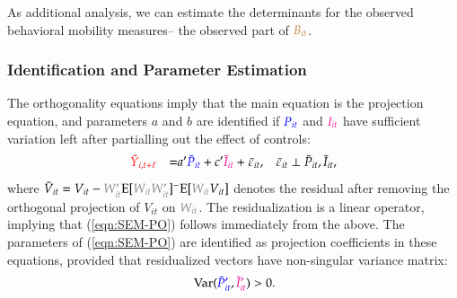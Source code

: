 \documentclass[9pt,twoside,lineno]{pnas-new}
\theoremstyle{definition}
\providecommand{\Var}{{\mathrm{Var}}}
\newcommand{\Ep}{{\mathrm{E}}}
\def\bcolor{\color{brown}}
\def\pcolor{\color{blue}}
\def\icolor{\color{magenta}}
\def\wcolor{\color{gray}}
\def\ycolor{\color{red}}
\begin{document}
As additional analysis, we can estimate the determinants for the observed behavioral mobility measures-- the observed part of  ${\bcolor B_{it}}$. 




\subsubsection*{Identification and Parameter Estimation}

The orthogonality equations imply that the main equation is the projection equation, and parameters $a$ and $b$ are identified if ${\pcolor P_{it}}$ and ${\icolor I_{it}}$ have sufficient variation left after partialling out the effect of controls:
\begin{equation}\label{eqn:SEM-PO}
 \begin{aligned}
   & {\ycolor { \tilde Y_{i,t+\ell}}}  & =& a '{\pcolor {\tilde P_{it}}} +c' {\icolor \tilde I_{it} } + \bar \varepsilon_{it},&\bar \varepsilon_{it} &\perp{\tilde  P_{it}}, { \tilde I_{it}},  \\
   \end{aligned}
\end{equation}
where $ \tilde V_{it} = V_{it}   -     {\wcolor W_{it}'} \Ep[{\wcolor W_{it}W_{it}'}]^{-} \Ep[{\wcolor W_{it}} V_{it}]$ denotes
the residual after removing the orthogonal projection of $V_{it}$ on ${\wcolor W_{it}}$. The residualization is a linear operator, implying that (\ref{eqn:SEM-PO}) follows immediately from the above. The parameters of (\ref{eqn:SEM-PO})  are identified as projection coefficients in these equations, provided that residualized vectors have non-singular variance 
matrix: \begin{equation}
 \ \Var ({\pcolor \tilde P_{it}'}, {\icolor \tilde I_{it}'})> 0.
 \end{equation}
\end{document}
